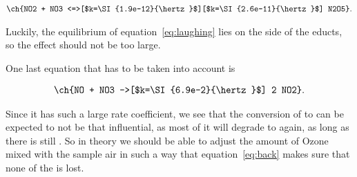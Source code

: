 \begin{align}
  \ch{NO2 + NO3
  <=>[$k=\SI{1.9e-12}{\hertz}$][$k=\SI{2.6e-11}{\hertz}$] N2O5}. \label{eq:laughing}
\end{align}

Luckily, the equilibrium of equation~\eqref{eq:laughing} lies on the
side of the educts, so the effect should not be too large.

One last equation that has to be taken into account is

\begin{align}
  \ch{NO + NO3 ->[$k=\SI{6.9e-2}{\hertz}$] 2 NO2}.\label{eq:back}
\end{align}

Since it has such a large rate coefficient, we see that the conversion
of  to  can be expected to not be that influential, as
most of it will degrade to  again, as long as there is still
. So in theory we should be able to adjust the amount of Ozone
mixed with the sample air in such a way that equation~\eqref{eq:back}
makes sure that none of the  is lost.

